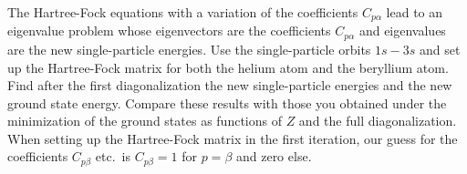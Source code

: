 The Hartree-Fock equations with a variation of the coefficients $C_{p\alpha}$ lead to an eigenvalue problem whose eigenvectors are the coefficients $C_{p\alpha}$ and eigenvalues are the new single-particle energies.
Use the single-particle orbits $1s{-}3s$ and set up the Hartree-Fock matrix for both the helium atom and the beryllium atom.
Find after the first diagonalization the new single-particle energies and the new ground state energy.
Compare these results with those you obtained under the minimization of the ground states as functions of $Z$ and the full diagonalization.
When setting up the Hartree-Fock matrix in the first iteration, our guess for the coefficients $C_{p\beta}$ etc.\ is $C_{p\beta}=1$ for $p=\beta$ and zero else.
